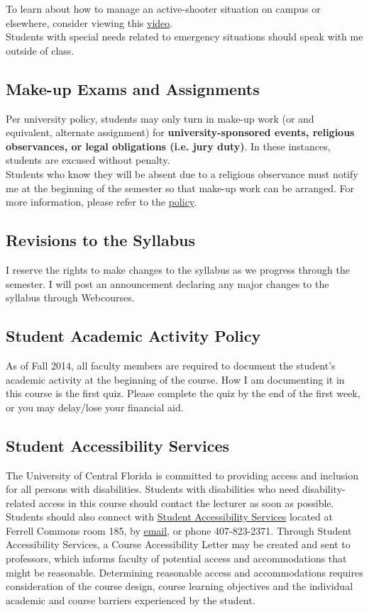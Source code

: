 \documentclass[11pt]{paper}
\begin{document}
To learn about how to manage an active-shooter situation on campus or elsewhere, consider viewing this \href{https://www.youtube.com/watch?v=NIKYajEx4pk&feature=youtu.be}{video}.\\

Students with special needs related to emergency situations should speak with me outside of class.

\subsection{Make-up Exams and Assignments}
Per university policy, students may only turn in make-up work (or and equivalent, alternate assignment) for \textbf{university-sponsored events, religious observances, or legal obligations (i.e. jury duty)}. In these instances, students are excused without penalty.\\

Students who know they will be absent due to a religious observance must notify me at the beginning of the semester so that make-up work can be arranged. For more information, please refer to the \href{https://regulations.ucf.edu/docs/notices/5.020ReligiousObservancesNEW_Oct09_000.pdf}{policy}.

\subsection{Revisions to the Syllabus}
I reserve the rights to make changes to the syllabus as we progress through the semester. I will post an announcement declaring any major changes to the syllabus through Webcourses.

\subsection{Student Academic Activity Policy}
As of Fall 2014, all faculty members are required to document the student's academic activity at the beginning of the course. How I am documenting it in this course is the first quiz. Please complete the quiz by the end of the first week, or you may delay/lose your financial aid. 
\subsection{Student Accessibility Services}
The University of Central Florida is committed to providing access and inclusion for all persons with disabilities. Students with disabilities who need disability-related access in this course should contact the lecturer as soon as possible. Students should also connect with \href{https://sas.sdes.ucf.edu}{Student Accessibility Services} located at Ferrell Commons room 185, by \href{mailto:emailsas@ucf.edu}{email}, or phone 407-823-2371. Through Student Accessibility Services, a Course Accessibility Letter may be created and sent to professors, which informs faculty of potential access and accommodations that might be reasonable. Determining reasonable access and accommodations requires consideration of the course design, course learning objectives and the individual academic and course barriers experienced by the student.
\end{document}

